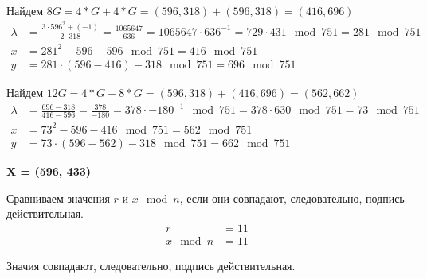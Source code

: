 Найдем $8G = 4*G+4*G=(596, 318) + (596, 318) = (416, 696)$
\begin{equation*}
	\begin{aligned}
		\lambda &= \frac{ 3 \cdot 596^2 + (-1) }{2 \cdot 318} = \frac{1065647}{636} = 1065647 \cdot 636^{-1} = 729 \cdot 431\mod{751} = 281\mod{751} \\
		x &= 281^2 - 596 - 596 \mod{751} = 416\mod{751} \\
		y &= 281 \cdot (596 - 416) - 318\mod{751} = 696\mod{751}
	\end{aligned}
\end{equation*}

 Найдем $12G = 4*G+8*G=(596, 318) + (416, 696) = (562, 662)$
\begin{equation*}
	\begin{aligned}
		\lambda &= \frac{696-318}{416-596} = \frac{378}{-180} = 378 \cdot -180^{-1}\mod{751} = 378 \cdot 630\mod{751} = 73\mod{751} \\
		x &= 73^2 - 596 - 416 \mod{751} = 562\mod{751} \\
		y &= 73 \cdot (596 - 562) - 318\mod{751} = 662\mod{751}
	\end{aligned}
\end{equation*}

\textbf{X = (596, 433)}

Сравниваем значения $r$ и $x \mod n$, если они совпадают, следовательно, подпись действительная.
\begin{equation*}
	\begin{aligned}
		r &= 11 \\
		x \mod n &= 11
	\end{aligned}
\end{equation*}

Значия совпадают, следовательно,  подпись действительная.